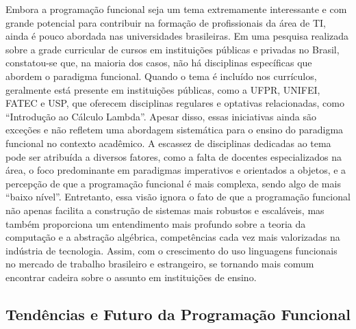 Embora a programação funcional seja um tema extremamente interessante e com grande potencial para contribuir na formação de profissionais da área de TI, ainda é pouco abordada nas universidades brasileiras. Em uma pesquisa realizada sobre a grade curricular de cursos em instituições públicas e privadas no Brasil, constatou-se que, na maioria dos casos, não há disciplinas específicas que abordem o paradigma funcional.
Quando o tema é incluído nos currículos, geralmente está presente em instituições públicas, como a UFPR, UNIFEI, FATEC e USP, que oferecem disciplinas regulares e optativas relacionadas, como “Introdução ao Cálculo Lambda”. Apesar disso, essas iniciativas ainda são exceções e não refletem uma abordagem sistemática para o ensino do paradigma funcional no contexto acadêmico.
A escassez de disciplinas dedicadas ao tema pode ser atribuída a diversos fatores, como a falta de docentes especializados na área, o foco predominante em paradigmas imperativos e orientados a objetos, e a percepção de que a programação funcional é mais complexa, sendo algo de mais “baixo nível”. Entretanto, essa visão ignora o fato de que a programação funcional não apenas facilita a construção de sistemas mais robustos e escaláveis, mas também proporciona um entendimento mais profundo sobre a teoria da computação e a abstração algébrica, competências cada vez mais valorizadas na indústria de tecnologia. Assim, com o crescimento do uso linguagens funcionais no mercado de trabalho brasileiro e estrangeiro, se tornando mais comum encontrar cadeira sobre o assunto em instituições de ensino. 


\subsection{Tendências e Futuro da Programação Funcional}

